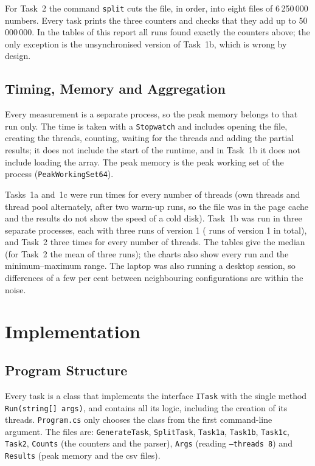 \documentclass[12pt,a4paper]{article}
\begin{document}
For Task~2 the command \texttt{split} cuts the file, in order, into eight files of 6\,250\,000 numbers. Every task prints the three counters and checks that they add up to 50\,000\,000. In the tables of this report all runs found exactly the counters above; the only exception is the unsynchronised version of Task~1b, which is wrong by design.

\subsection{Timing, Memory and Aggregation}

Every measurement is a separate process, so the peak memory belongs to that run only. The time is taken with a \texttt{Stopwatch} and includes opening the file, creating the threads, counting, waiting for the threads and adding the partial results; it does not include the start of the runtime, and in Task~1b it does not include loading the array. The peak memory is the peak working set of the process (\texttt{PeakWorkingSet64}).

Tasks~1a and~1c were run \aRunsEach{} times for every number of threads (own threads and thread pool alternately, after two warm-up runs, so the file was in the page cache and the results do not show the speed of a cold disk). Task~1b was run in three separate processes, each with three runs of version 1 (\bRuns{} runs of version 1 in total), and Task~2 three times for every number of threads. The tables give the median (for Task~2 the mean of three runs); the charts also show every run and the minimum--maximum range. The laptop was also running a desktop session, so differences of a few per cent between neighbouring configurations are within the noise.

\newpage
\section{Implementation}

\subsection{Program Structure}

Every task is a class that implements the interface \texttt{ITask} with the single method \texttt{Run(string[] args)}, and contains all its logic, including the creation of its threads. \texttt{Program.cs} only chooses the class from the first command-line argument. The files are: \texttt{GenerateTask}, \texttt{SplitTask}, \texttt{Task1a}, \texttt{Task1b}, \texttt{Task1c}, \texttt{Task2}, \texttt{Counts} (the counters and the parser), \texttt{Args} (reading \texttt{--threads 8}) and \texttt{Results} (peak memory and the csv files).
\end{document}

